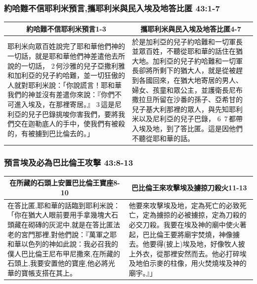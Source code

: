 \subsubsection{約哈難不信耶利米預言,攜耶利米與民入埃及地答比匿 43:1-7}
\begin{table}[H]
\centering
\begin{tabular}{p{8.5cm}|p{9.0cm}}\hline\hline
\multicolumn{1}{c|}{約哈難不信耶利米預言1-3}&\multicolumn{1}{c}{攜耶利米與民入埃及地答比匿4-7}\\\hline
耶利米向眾百姓說完了耶和華他們神的一切話，就是耶和華他們神差遣他去所說的一切話， 2 何沙雅的兒子亞撒利雅和加利亞的兒子約哈難，並一切狂傲的人就對耶利米說：「你說謊言！耶和華我們的神並沒有差遣你來說：『你們不可進入埃及，在那裡寄居。』 3 這是尼利亞的兒子巴錄挑唆你害我們，要將我們交在迦勒底人的手中，使我們有被殺的，有被擄到巴比倫去的。」
&於是加利亞的兒子約哈難和一切軍長並眾百姓，不聽從耶和華的話住在猶大地。加利亞的兒子約哈難和一切軍長卻將所剩下的猶大人，就是從被趕到各國回來，在猶大地寄居的男人、婦女、孩童和眾公主，並護衛長尼布撒拉旦所留在沙番的孫子、亞希甘的兒子基大利那裡的眾人，與先知耶利米以及尼利亞的兒子巴錄， 6  7 都帶入埃及地，到了答比匿。這是因他們不聽從耶和華的話。\\\hline
\end{tabular}
\end{table}

\subsubsection{預言埃及必為巴比倫王攻擊 43:8-13}
\begin{table}[H]
\centering
\begin{tabular}{p{8.85cm}|p{8.65cm}}\hline\hline
\multicolumn{1}{c|}{在所藏的石頭上安置巴比倫王寶座8-10}&\multicolumn{1}{c}{巴比倫王來攻擊埃及擄掠刀殺火11-13}\\\hline
在答比匿,耶和華的話臨到耶利米說：「你在猶大人眼前要用手拿幾塊大石頭藏在砌磚的灰泥中,就是在答比匿法老的宮門那裡,對他們說：『萬軍之耶和華以色列的神如此說：我必召我的僕人巴比倫王尼布甲尼撒來,在所藏的石頭上,我要安置他的寶座,他必將光華的寶帳支搭在其上。
&他要來攻擊埃及地，定為死亡的必致死亡，定為擄掠的必被擄掠，定為刀殺的必交刀殺。我要在埃及神的廟中使火著起，巴比倫王要將廟宇焚燒，神像擄去。他要得(披上)埃及地，好像牧人披上外衣，從那裡安然而去。他必打碎埃及地伯示麥的柱像，用火焚燒埃及神的廟宇。』」\\\hline
\end{tabular}
\end{table}

